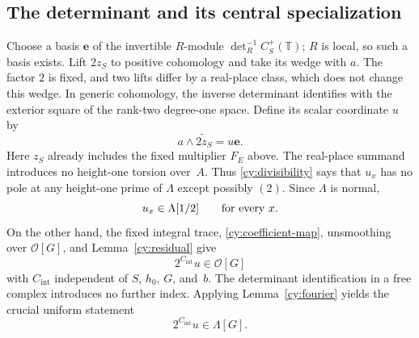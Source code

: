 \subsection{The determinant and its central specialization}

Choose a basis $\mathbf e$ of the invertible $R$-module
$\det_R^{-1}C_S^+(\mathbb T)$; $R$ is local, so such a basis exists.
Lift $2z_S$ to positive cohomology and take its wedge with $a$.
The factor $2$ is fixed, and two lifts differ by a real-place class,
which does not change this wedge.  In generic cohomology, the inverse
determinant identifies with the exterior square of the rank-two
degree-one space.  Define its scalar coordinate $u$ by
\[
 a\wedge\widetilde{2z_S}=u\mathbf e.
\]
Here $z_S$ already includes the fixed multiplier $F_E$ above.
The real-place summand introduces no height-one torsion over~$A$.  Thus
\eqref{cy:divisibility} says that $u_x$ has no pole at any height-one
prime of $\Lambda$ except possibly $(2)$.  Since $\Lambda$ is normal,
\begin{equation}\label{cy:rational-membership}
 u_x\in\Lambda[1/2]\qquad\hbox{for every }x.
\end{equation}
On the other hand, the fixed integral trace,
\eqref{cy:coefficient-map}, unsmoothing over $\mathcal O[G]$, and
Lemma~\ref{cy:residual} give
\[
 2^{C_{\mathrm{int}}}u\in\mathcal O[G]
\]
with $C_{\mathrm{int}}$ independent of $S$, $h_0$, $G$, and~$b$.
The determinant identification in a free complex introduces no further
index.  Applying Lemma~\ref{cy:fourier} yields the crucial uniform statement
\begin{equation}\label{cy:uniform-integrality}
                  2^{C_{\mathrm{int}}}u\in\Lambda[G].
\end{equation}

